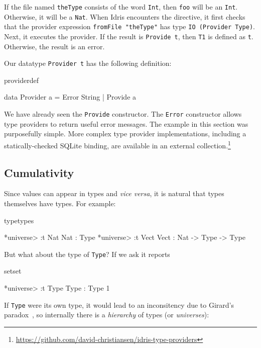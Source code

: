 \noindent
If the file named \texttt{theType} consists of the word \texttt{Int}, then
\texttt{foo} will be an \texttt{Int}. Otherwise, it will be a \texttt{Nat}.
When Idris encounters the directive, it first checks that the provider
expression \texttt{fromFile "theType"} has type \texttt{IO (Provider
  Type)}. Next, it executes the provider. If the result is \texttt{Provide t},
then \texttt{T1} is defined as \texttt{t}. Otherwise, the result is an error.

Our datatype \texttt{Provider t} has the following definition:

\begin{SaveVerbatim}{providerdef}

data Provider a = Error String
                | Provide a

\end{SaveVerbatim}

\noindent
We have already seen the \texttt{Provide} constructor. The \texttt{Error}
constructor allows type providers to return useful error messages.  The
example in this section was purposefully simple. More complex type provider
implementations, including a statically-checked SQLite binding, are available
in an external collection.\footnote{\url{https://github.com/david-christiansen/idris-type-providers}}

\subsection{Cumulativity}

Since values can appear in types and \emph{vice versa}, it is natural that types themselves
have types. For example:

\begin{SaveVerbatim}{typetypes}

*universe> :t Nat
Nat : Type
*universe> :t Vect
Vect : Nat -> Type -> Type

\end{SaveVerbatim}

\noindent
But what about the type of \texttt{Type}? If we ask \Idris{} it reports

\begin{SaveVerbatim}{setset}

*universe> :t Type
Type : Type 1

\end{SaveVerbatim}

\noindent
If \texttt{Type} were its own type, it would lead to an inconsitency
due to Girard's paradox~\cite{girard-thesis}, so internally there is a \emph{hierarchy}
of types (or \emph{universes}):

